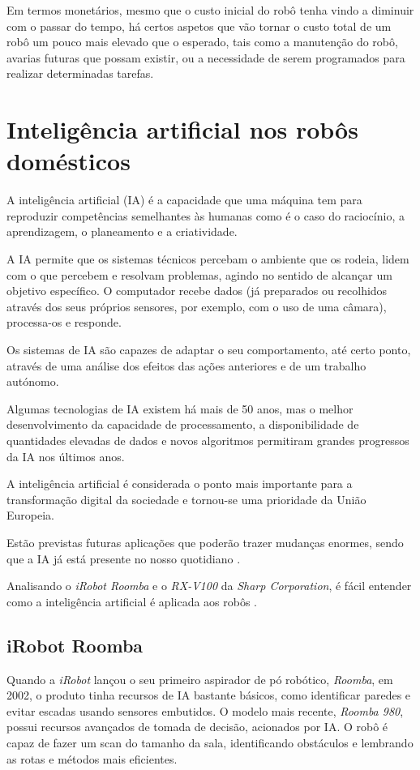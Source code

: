 \documentclass[10pt]{article}
\begin{document}
Em termos monetários, mesmo que o custo inicial do robô tenha vindo a diminuir com o passar do tempo, há certos aspetos que vão tornar o custo total de um robô um pouco mais elevado que o esperado, tais como a manutenção do robô, avarias futuras que possam existir, ou a necessidade de serem programados para realizar determinadas tarefas.


\section{Inteligência artificial nos robôs domésticos}

\hspace{\parindent}A inteligência artificial (IA) é a capacidade que uma máquina tem para reproduzir competências semelhantes às humanas como é o caso do raciocínio, a aprendizagem, o planeamento e a criatividade.

A IA permite que os sistemas técnicos percebam o ambiente que os rodeia, lidem com o que percebem e resolvam problemas, agindo no sentido de alcançar um objetivo específico. O computador recebe dados (já preparados ou recolhidos através dos seus próprios sensores, por exemplo, com o uso de uma câmara), processa-os e responde.

Os sistemas de IA são capazes de adaptar o seu comportamento, até certo ponto, através de uma análise dos efeitos das ações anteriores e de um trabalho autónomo.

Algumas tecnologias de IA existem há mais de 50 anos, mas o melhor desenvolvimento da capacidade de processamento, a disponibilidade de quantidades elevadas de dados e novos algoritmos permitiram grandes progressos da IA nos últimos anos.

A inteligência artificial é considerada o ponto mais importante para a transformação digital da sociedade e tornou-se uma prioridade da União Europeia.

Estão previstas futuras aplicações que poderão trazer mudanças enormes, sendo que a IA já está presente no nosso quotidiano \cite{airobots}.


Analisando o \textit{iRobot Roomba} e o \textit{RX-V100} da \textit{Sharp Corporation}, é fácil entender como a inteligência artificial é aplicada aos robôs \cite{ai}.

\subsection{iRobot Roomba}
\hspace{\parindent}Quando a \textit{iRobot} lançou o seu primeiro aspirador de pó robótico, \textit{Roomba}, em 2002, o produto tinha recursos de IA bastante básicos, como identificar paredes e evitar escadas usando sensores embutidos. O modelo mais recente, \textit{Roomba 980},  possui recursos avançados de tomada de decisão, acionados por IA. O robô é capaz de fazer um scan do tamanho da sala, identificando obstáculos e lembrando as rotas e métodos mais eficientes.
\end{document}
